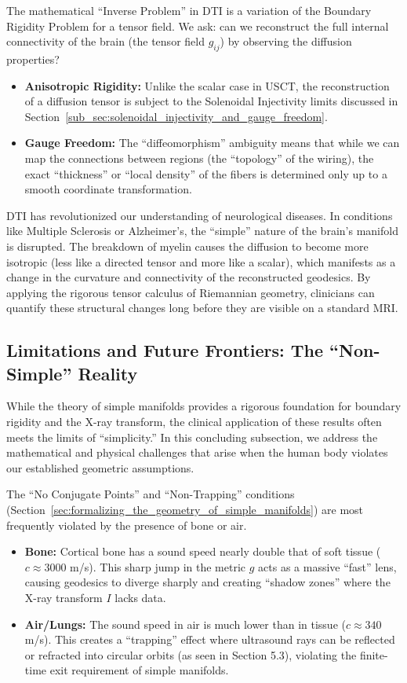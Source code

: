 The mathematical ``Inverse Problem'' in DTI is a variation of the Boundary Rigidity Problem for a tensor field. We ask: can we reconstruct the full internal connectivity of the brain (the tensor field $g_{ij}$) by observing the diffusion properties?
\begin{itemize}
  \item \textbf{Anisotropic Rigidity:} Unlike the scalar case in USCT, the reconstruction of a diffusion tensor is subject to the Solenoidal Injectivity limits discussed in Section~\ref{sub_sec:solenoidal_injectivity_and_gauge_freedom}.
  \item \textbf{Gauge Freedom:} The ``diffeomorphism'' ambiguity means that while we can map the connections between regions (the ``topology'' of the wiring), the exact ``thickness'' or ``local density'' of the fibers is determined only up to a smooth coordinate transformation.
\end{itemize}

DTI has revolutionized our understanding of neurological diseases. In conditions like Multiple Sclerosis or Alzheimer's, the ``simple'' nature of the brain's manifold is disrupted. The breakdown of myelin causes the diffusion to become more isotropic (less like a directed tensor and more like a scalar), which manifests as a change in the curvature and connectivity of the reconstructed geodesics. By applying the rigorous tensor calculus of Riemannian geometry, clinicians can quantify these structural changes long before they are visible on a standard MRI.

\subsection{Limitations and Future Frontiers: The ``Non-Simple'' Reality} While the theory of simple manifolds provides a rigorous foundation for boundary rigidity and the X-ray transform, the clinical application of these results often meets the limits of ``simplicity.'' In this concluding subsection, we address the mathematical and physical challenges that arise when the human body violates our established geometric assumptions.

The ``No Conjugate Points'' and ``Non-Trapping'' conditions (Section~\ref{sec:formalizing_the_geometry_of_simple_manifolds}) are most frequently violated by the presence of bone or air.

\begin{itemize}
  \item \textbf{Bone:} Cortical bone has a sound speed nearly double that of soft tissue ($c \approx 3000$ m/s). This sharp jump in the metric $g$ acts as a massive ``fast'' lens, causing geodesics to diverge sharply and creating ``shadow zones'' where the X-ray transform $I$ lacks data.
  \item \textbf{Air/Lungs:} The sound speed in air is much lower than in tissue ($c \approx 340$ m/s). This creates a ``trapping'' effect where ultrasound rays can be reflected or refracted into circular orbits (as seen in Section 5.3), violating the finite-time exit requirement of simple manifolds.
\end{itemize}

